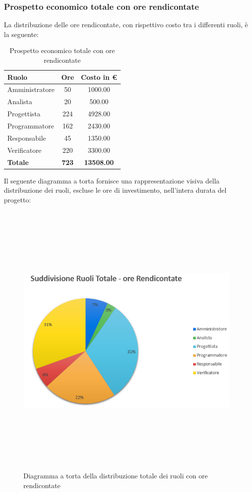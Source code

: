 \newpage

\subsubsection{Prospetto economico totale con ore rendicontate}
La distribuzione delle ore rendicontate, con rispettivo costo tra i differenti ruoli, è la seguente:

\begin{table}[htbp]
\centering
\begin{tabular}{| l c c |}
\hline
\textbf{Ruolo} & \textbf{Ore} & \textbf{Costo in €}\\
\hline
Amministratore & 50 & 1000.00\\
Analista & 20 & 500.00 \\
Progettista & 224 & 4928.00 \\
Programmatore & 162 & 2430.00\\
Responsabile & 45 & 1350.00\\
Verificatore & 220 & 3300.00\\
\hline
\textbf{Totale} & \textbf{723} & \textbf{13508.00}\\
\hline
\end{tabular}
\caption[Totale con ore rendicontate - Prospetto economico]{Prospetto economico totale con ore rendicontate}
\end{table}

Il seguente diagramma a torta fornisce una rappresentazione visiva della distribuzione dei ruoli, escluse le ore di investimento, nell'intera durata del progetto:

\begin{figure}[htbp]
\centering
\includegraphics[width=14cm,height=14cm,keepaspectratio]{./img/ProspettoOrario/SRTotRend.png}
\caption[Totale con ore rendicontate - Diagramma a torta suddivisione ruoli]{Diagramma a torta della distribuzione totale dei ruoli con ore rendicontate}
\end{figure}


